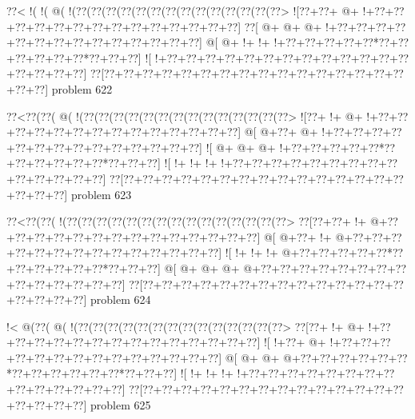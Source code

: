 \vbox{\vbox{\goo
\0??<\- !(\- !(\- @(\- !(\0??(\0??(\0??(\0??(\0??(\0??(\0??(\0??(\0??(\0??(\0??(\0??(\0??(\0??>
\- ![\0??+\0??+\- @+\- !+\0??+\0??+\0??+\0??+\0??+\0??+\0??+\0??+\0??+\0??+\0??+\0??+\0??+\0??]
\0??[\- @+\- @+\- @+\- !+\0??+\0??+\0??+\0??+\0??+\0??+\0??+\0??+\0??+\0??+\0??+\0??+\0??+\0??]
\- @[\- @+\- !+\- !+\- !+\0??+\0??+\0??+\0??+\0??*\0??+\0??+\0??+\0??+\0??+\0??*\0??+\0??+\0??]
\- ![\- !+\0??+\0??+\0??+\0??+\0??+\0??+\0??+\0??+\0??+\0??+\0??+\0??+\0??+\0??+\0??+\0??+\0??]
\0??[\0??+\0??+\0??+\0??+\0??+\0??+\0??+\0??+\0??+\0??+\0??+\0??+\0??+\0??+\0??+\0??+\0??+\0??]
}
\hfil problem 622\hfil\break
}



\vbox{\vbox{\goo
\0??<\0??(\0??(\- @(\- !(\0??(\0??(\0??(\0??(\0??(\0??(\0??(\0??(\0??(\0??(\0??(\0??(\0??(\0??>
\- ![\0??+\- !+\- @+\- !+\0??+\0??+\0??+\0??+\0??+\0??+\0??+\0??+\0??+\0??+\0??+\0??+\0??+\0??]
\- @[\- @+\0??+\- @+\- !+\0??+\0??+\0??+\0??+\0??+\0??+\0??+\0??+\0??+\0??+\0??+\0??+\0??+\0??]
\- ![\- @+\- @+\- @+\- !+\0??+\0??+\0??+\0??+\0??*\0??+\0??+\0??+\0??+\0??+\0??*\0??+\0??+\0??]
\- ![\- !+\- !+\- !+\- !+\0??+\0??+\0??+\0??+\0??+\0??+\0??+\0??+\0??+\0??+\0??+\0??+\0??+\0??]
\0??[\0??+\0??+\0??+\0??+\0??+\0??+\0??+\0??+\0??+\0??+\0??+\0??+\0??+\0??+\0??+\0??+\0??+\0??]
}
\hfil problem 623\hfil\break
}



\vbox{\vbox{\goo
\0??<\0??(\0??(\- !(\0??(\0??(\0??(\0??(\0??(\0??(\0??(\0??(\0??(\0??(\0??(\0??(\0??(\0??(\0??>
\0??[\0??+\0??+\- !+\- @+\0??+\0??+\0??+\0??+\0??+\0??+\0??+\0??+\0??+\0??+\0??+\0??+\0??+\0??]
\- @[\- @+\0??+\- !+\- @+\0??+\0??+\0??+\0??+\0??+\0??+\0??+\0??+\0??+\0??+\0??+\0??+\0??+\0??]
\- ![\- !+\- !+\- !+\- @+\0??+\0??+\0??+\0??+\0??*\0??+\0??+\0??+\0??+\0??+\0??*\0??+\0??+\0??]
\- @[\- @+\- @+\- @+\- @+\0??+\0??+\0??+\0??+\0??+\0??+\0??+\0??+\0??+\0??+\0??+\0??+\0??+\0??]
\0??[\0??+\0??+\0??+\0??+\0??+\0??+\0??+\0??+\0??+\0??+\0??+\0??+\0??+\0??+\0??+\0??+\0??+\0??]
}
\hfil problem 624\hfil\break
}



\vbox{\vbox{\goo
\- !<\- @(\0??(\- @(\- !(\0??(\0??(\0??(\0??(\0??(\0??(\0??(\0??(\0??(\0??(\0??(\0??(\0??(\0??>
\0??[\0??+\- !+\- @+\- !+\0??+\0??+\0??+\0??+\0??+\0??+\0??+\0??+\0??+\0??+\0??+\0??+\0??+\0??]
\- ![\- !+\0??+\- @+\- !+\0??+\0??+\0??+\0??+\0??+\0??+\0??+\0??+\0??+\0??+\0??+\0??+\0??+\0??]
\- @[\- @+\- @+\- @+\0??+\0??+\0??+\0??+\0??+\0??*\0??+\0??+\0??+\0??+\0??+\0??*\0??+\0??+\0??]
\- ![\- !+\- !+\- !+\- !+\0??+\0??+\0??+\0??+\0??+\0??+\0??+\0??+\0??+\0??+\0??+\0??+\0??+\0??]
\0??[\0??+\0??+\0??+\0??+\0??+\0??+\0??+\0??+\0??+\0??+\0??+\0??+\0??+\0??+\0??+\0??+\0??+\0??]
}
\hfil problem 625\hfil\break
}



